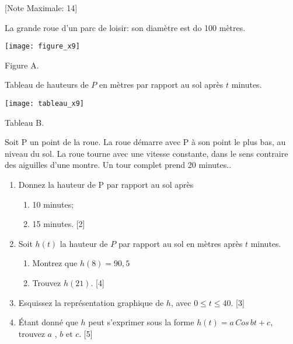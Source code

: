 \begin{question}
  \hspace*{\fill} [Note Maximale: 14]\par
  \medskip
  \begin{center} %
    \noindent La grande roue d'un parc de loisir: son diamètre est do 100 mètres.\par
    \texttt{[image: figure\_x9]}\par
    \noindent Figure A.\par
  \end{center} %
  \medskip
  \begin{center} %
    \noindent Tableau de hauteurs de $P$ en mètres par rapport au sol après $t$ minutes.\par
    \texttt{[image: tableau\_x9]}\par
    \noindent Tableau B.\par
  \end{center} %

  \noindent Soit P un point de la roue. La roue démarre avec P à son point le plus bas, au niveau
du sol. La roue tourne avec une vitesse constante, dans le sens contraire des aiguilles
d’une montre. Un tour complet prend 20 minutes..\par
  \begin{enumerate}[label=(\alph*)]
  \item Donnez la hauteur de P par rapport au sol après
      \begin{enumerate}[label=(\roman*)]
        \item 10 minutes;
        \item 15 minutes.\hspace*{\fill} [2]
      \end{enumerate}
    \item Soit $h(t)$ la hauteur de $P$ par rapport au sol en mètres après $t$ minutes.
      \begin{enumerate}[label=(\roman*)]
        \item Montrez que $h(8)=90,5$
        \item Trouvez $h(21)$.\hspace*{\fill} [4]
      \end{enumerate}
    \item Esquissez la représentation graphique de $h$, avec $0 \le t \le 40.$\hspace*{\fill} [3]
    \item Étant donné que $h$ peut s’exprimer sous la forme $h(t) = a\,Cos\,bt + c$, trouvez $a$ , $b$ et $c$.\hspace*{\fill} [5]
  \end{enumerate}
\end{question}
